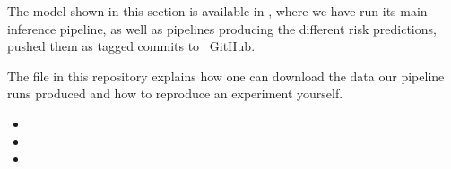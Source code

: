 \begin{tcolorbox}[
    title=\faIcon{recycle} Reproducibility,
    parbox=false,
    float
]
    The model shown in this section is available in , where we have run its main inference pipeline, as well as pipelines producing the different risk predictions, pushed them as tagged commits to ~GitHub.

    The  file in this repository explains how one can download the data our pipeline runs produced and how to reproduce an experiment yourself.

    \begin{itemize}
        \item {}
        \item {}
        \item {}
    \end{itemize}
\end{tcolorbox}
